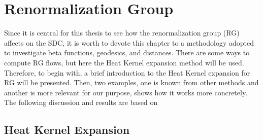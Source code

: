 \chapter{Renormalization Group}
\label{Chapter2}
Since it is central for this thesis to see how the renormalization group (RG) affects on the SDC, it is worth to devote this chapter to a methodology adopted to investigate beta functions, geodesics, and distances. There are some ways to compute RG flows, but here the Heat Kernel expansion method will be used. Therefore, to begin with, a brief introduction to the Heat Kernel expansion for RG will be presented. Then, two examples, one is known from other methods and another is more relevant for our purpose, shows how it works more concretely. The following discussion and results are based on %
\section{Heat Kernel Expansion} 
